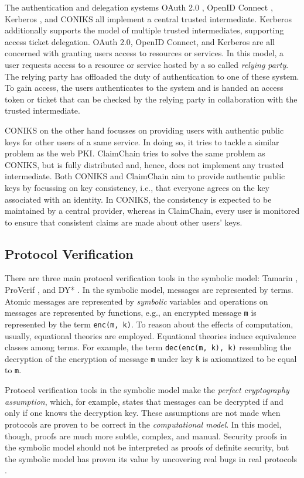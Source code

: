 \documentclass{article}
\begin{document}
The authentication and delegation systems OAuth 2.0 \cite{OAuthRFC}, OpenID Connect \cite{OpenIdConnect}, Kerberos \cite{KerberosRFC}, and CONIKS \cite{Coniks} all implement a central trusted intermediate.
Kerberos additionally supports the model of multiple trusted intermediates, supporting access ticket delegation.
OAuth 2.0, OpenID Connect, and Kerberos are all concerned with granting users access to resources or services.
In this model, a user requests access to a resource or service hosted by a so called \textit{relying party}.
The relying party has offloaded the duty of authentication to one of these system.
To gain access, the users authenticates to the system and is handed an access token or ticket that can be checked by the relying party in collaboration with the trusted intermediate.

CONIKS on the other hand focusses on providing users with authentic public keys for other users of a same service.
In doing so, it tries to tackle a similar problem as the web PKI.
ClaimChain \cite{ClaimChain} tries to solve the same problem as CONIKS, but is fully distributed and, hence, does not implement any trusted intermediate.
Both CONIKS and ClaimChain aim to provide authentic public keys by focussing on key consistency, i.e., that everyone agrees on the key associated with an identity.
In CONIKS, the consistency is expected to be maintained by a central provider, whereas in ClaimChain, every user is monitored to ensure that consistent claims are made about other users' keys.

\subsection{Protocol Verification}

There are three main protocol verification tools in the symbolic model: Tamarin \cite{tamarin}, ProVerif \cite{ProVerif}, and DY* \cite{DYStar}.
In the symbolic model, messages are represented by terms.
Atomic messages are represented by \emph{symbolic} variables and
operations on messages are represented by functions, e.g., an encrypted message \texttt{m} is represented by the term \texttt{enc(m, k)}.
To reason about the effects of computation, usually, equational theories are employed.
Equational theories induce equivalence classes among terms.
For example, the term \texttt{dec(enc(m, k), k)} resembling the decryption of the encryption of message \texttt{m} under key \texttt{k} is axiomatized to be equal to \texttt{m}.

Protocol verification tools in the symbolic model make the \textit{perfect cryptography assumption}, which, for example, states that messages can be decrypted if and only if one knows the decryption key.
These assumptions are not made when protocols are proven to be correct in the \textit{computational model}.
In this model, though, proofs are much more subtle, complex, and manual.
Security proofs in the symbolic model should not be interpreted as proofs of definite security, but the symbolic model has proven its value by uncovering real bugs in real protocols \cite{SeemsLegit,MastercardTamarin}.
\end{document}
